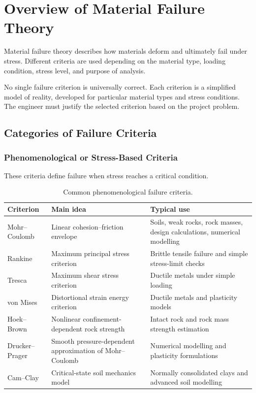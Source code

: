 \documentclass[a4paper,12pt]{article}
\begin{document}
\section{Overview of Material Failure Theory}

Material failure theory describes how materials deform and ultimately fail under stress.
Different criteria are used depending on the material type, loading condition, stress
level, and purpose of analysis.

\begin{keybox}
No single failure criterion is universally correct. Each criterion is a simplified model
of reality, developed for particular material types and stress conditions. The engineer
must justify the selected criterion based on the project problem.
\end{keybox}

\subsection{Categories of Failure Criteria}

\subsubsection{Phenomenological or Stress-Based Criteria}

These criteria define failure when stress reaches a critical condition.

\begin{table}[H]
\centering
\small
\begin{tabularx}{\textwidth}{l Y Y}
\toprule
\textbf{Criterion} & \textbf{Main idea} & \textbf{Typical use} \\
\midrule
Mohr--Coulomb & Linear cohesion--friction envelope & Soils, weak rocks, rock masses, design calculations, numerical modelling \\
Rankine & Maximum principal stress criterion & Brittle tensile failure and simple stress-limit checks \\
Tresca & Maximum shear stress criterion & Ductile metals under simple loading \\
von Mises & Distortional strain energy criterion & Ductile metals and plasticity models \\
Hoek--Brown & Nonlinear confinement-dependent rock strength & Intact rock and rock mass strength estimation \\
Drucker--Prager & Smooth pressure-dependent approximation of Mohr--Coulomb & Numerical modelling and plasticity formulations \\
Cam--Clay & Critical-state soil mechanics model & Normally consolidated clays and advanced soil modelling \\
\bottomrule
\end{tabularx}
\caption{Common phenomenological failure criteria.}
\end{table}
\end{document}
